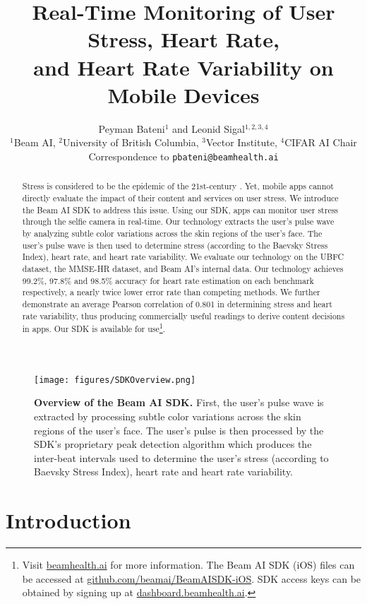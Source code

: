 \documentclass{article}
\title{Real-Time Monitoring of User Stress, Heart Rate, \\ and Heart Rate Variability on Mobile Devices}
\author{Peyman Bateni$^1$ and Leonid Sigal$^{1,2,3,4}$ \\
  $^1$Beam AI, $^2$University of British Columbia, $^3$Vector Institute, $^4$CIFAR AI Chair  \\
  Correspondence to \texttt{pbateni@beamhealth.ai} \\
}
\begin{document}
\maketitle

\vspace{-0.15in}
\begin{abstract}
Stress is considered to be the epidemic of the 21st-century \cite{Fink2016_StressEpidemic}. Yet, mobile apps cannot directly evaluate the impact of their content and services on user stress. We introduce the Beam AI SDK to address this issue. Using our SDK, apps can monitor user stress through the selfie camera in real-time. Our technology extracts the user’s pulse wave by analyzing subtle color variations across the skin regions of the user’s face. The user’s pulse wave is then used to determine stress (according to the Baevsky Stress Index), heart rate, and heart rate variability. We evaluate our technology on the UBFC dataset, the MMSE-HR dataset, and Beam AI's internal data. Our technology achieves 99.2\%, 97.8\% and 98.5\% accuracy for heart rate estimation on each benchmark respectively, a nearly twice lower error rate than competing methods. We further demonstrate an average Pearson correlation of 0.801 in determining stress and heart rate variability, thus producing commercially useful readings to derive content decisions in apps. Our SDK is available for use\footnote{Visit \url{beamhealth.ai} for more information. The Beam AI SDK (iOS) files can be accessed at \url{github.com/beamai/BeamAISDK-iOS}. SDK access keys can be obtained by signing up at \url{dashboard.beamhealth.ai}.}.
\end{abstract}

\begin{figure}[!b]
    \centering
    \texttt{[image: figures/SDKOverview.png]}
    \caption{{\bf Overview of the Beam AI SDK.} First, the user’s pulse wave is extracted by processing subtle color variations across the skin regions of the user’s face. The user’s pulse is then processed by the SDK's proprietary peak detection algorithm which produces the inter-beat intervals used to determine the user's stress (according to Baevsky Stress Index), heart rate and heart rate variability.}
    \label{fig:sdk-overview}
\end{figure}

\section{Introduction}
\end{document}
